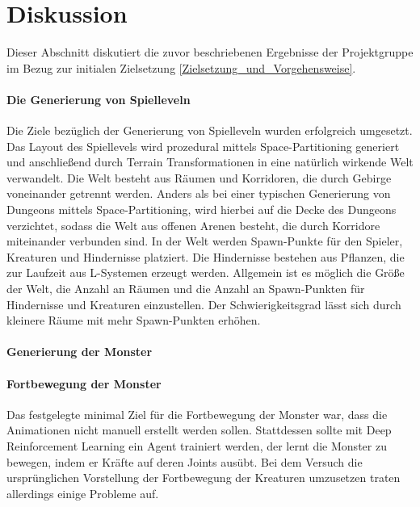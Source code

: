 \section{Diskussion}
\label{Diskussion}

Dieser Abschnitt diskutiert die zuvor beschriebenen Ergebnisse der Projektgruppe im Bezug zur initialen Zielsetzung \ref{Zielsetzung_und_Vorgehensweise}.

\paragraph{Die Generierung von Spielleveln}
Die Ziele bezüglich der Generierung von Spielleveln wurden erfolgreich umgesetzt.
Das Layout des Spiellevels wird prozedural mittels Space-Partitioning generiert und anschließend durch Terrain Transformationen in eine natürlich wirkende Welt verwandelt.
Die Welt besteht aus Räumen und Korridoren, die durch Gebirge voneinander getrennt werden.
Anders als bei einer typischen Generierung von Dungeons mittels Space-Partitioning, wird hierbei auf die Decke des Dungeons verzichtet, sodass die Welt aus offenen Arenen besteht, die durch Korridore miteinander verbunden sind.
In der Welt werden Spawn-Punkte für den Spieler, Kreaturen und Hindernisse platziert.
Die Hindernisse bestehen aus Pflanzen, die zur Laufzeit aus L-Systemen erzeugt werden.
Allgemein ist es möglich die Größe der Welt, die Anzahl an Räumen und die Anzahl an Spawn-Punkten für Hindernisse und Kreaturen einzustellen.
Der Schwierigkeitsgrad lässt sich durch kleinere Räume mit mehr Spawn-Punkten erhöhen.

\paragraph{Generierung der Monster}

\paragraph{Fortbewegung der Monster} \fup

Das festgelegte minimal Ziel für die Fortbewegung der Monster war, dass die Animationen nicht manuell erstellt werden sollen. 
Stattdessen sollte mit Deep Reinforcement Learning ein Agent trainiert werden, der lernt die Monster zu bewegen, indem er Kräfte auf deren Joints ausübt.
Bei dem Versuch die ursprünglichen Vorstellung der Fortbewegung der Kreaturen umzusetzen traten allerdings einige Probleme auf.\\

